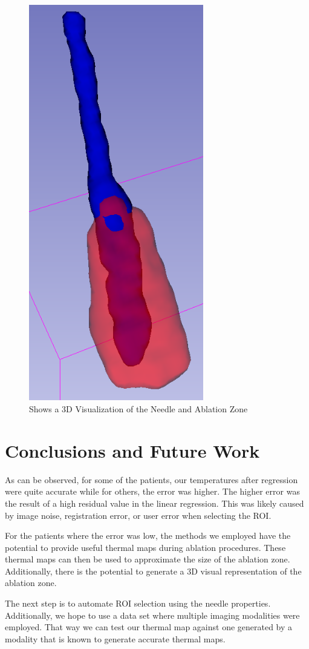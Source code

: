 \documentclass[]{spie}  %
\begin{document}
\begin{figure} 
\centering 
\includegraphics[width=3in]{NeedleAndAblationZone.png} 
\caption{Shows a 3D Visualization of the Needle and Ablation Zone} 
\end{figure}

\section{Conclusions and Future Work}

As can be observed, for some of the patients, our temperatures after regression were quite accurate while for others, the error was higher. The higher error was the result of a high residual value in the linear regression. This was likely caused by image noise, registration error, or user error when selecting the ROI. 

For the patients where the error was low, the methods we employed have the potential to provide useful thermal maps during ablation procedures. These thermal maps can then be used to approximate the size of the ablation zone. Additionally, there is the potential to generate a 3D visual representation of the ablation zone. 

The next step is to automate ROI selection using the needle properties. Additionally, we hope to use a data set where multiple imaging modalities were employed. That way we can test our thermal map against one generated by a modality that is known to generate accurate thermal maps. 



\end{document}
